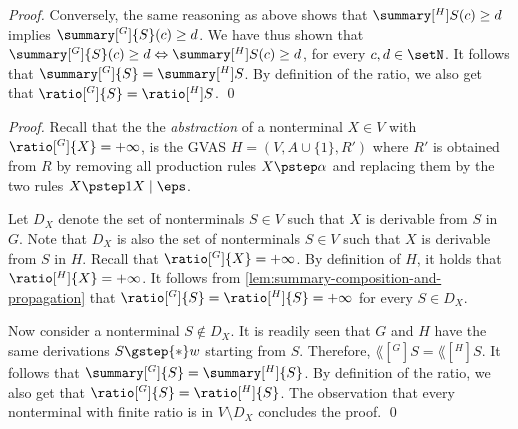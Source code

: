 \begin{proof}
  Conversely,
  the same reasoning as above shows that $\summary[^{H}]{S}(c) \geq d$
  implies $\summary[^G]{S}(c) \geq d$.
  We have thus shown that
  $\summary[^G]{S}(c) \geq d \Leftrightarrow \summary[^{H}]{S}(c) \geq d$,
  for every $c, d \in \setN$.
  It follows that $\summary[^G]{S} = \summary[^{H}]{S}$.
  By definition of the ratio,
  we also get that $\ratio[^G]{S} = \ratio[^{H}]{S}$.
  \qed
\end{proof}

\factabstraction*
\begin{proof}
Recall that the the \emph{abstraction} of a nonterminal $X \in V$ with
$\ratio[^G]{X} = +\infty$, is the GVAS $H = (V, A \cup \{1\}, R')$ where
$R'$ is obtained from $R$ by removing all production rules $X \pstep \alpha$ and
replacing them by the two rules $X \pstep 1 X \mid \eps$.
  
\smallskip

  Let $D_X$ denote the set of nonterminals $S \in V$ such that
  $X$ is derivable from $S$ in $G$.
  Note that $D_X$ is also the set of nonterminals $S \in V$ such that
  $X$ is derivable from $S$ in $H$.
  Recall that $\ratio[^G]{X} = +\infty$.
  By definition of $H$, it holds that $\ratio[^H]{X} = +\infty$.
  It follows from \cref{lem:summary-composition-and-propagation} that
  $\ratio[^G]{S} = \ratio[^H]{S} = +\infty$ for every $S \in D_X$.

  \smallskip

  Now consider a nonterminal $S \not\in D_X$.
  It is readily seen that $G$ and $H$ have the same derivations
  $S \gstep{*} w$ starting from $S$.
  Therefore, $\lang[^G]{S} = \lang[^H]{S}$.
  It follows that $\summary[^G]{S} = \summary[^H]{S}$.
  By definition of the ratio,
  we also get that $\ratio[^G]{S} = \ratio[^H]{S}$.
  The observation that every nonterminal with finite ratio is
  in $V \setminus D_X$ concludes the proof.
  \qed
\end{proof}


